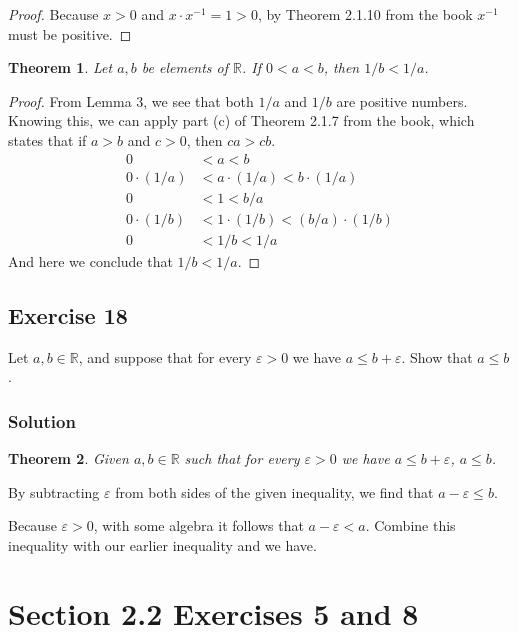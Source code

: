 \documentclass[12pt]{article}
\newtheorem*{thm}{Theorem}
\begin{document}
\begin{proof}
Because $x > 0$ and $x \cdot x^{-1} = 1 > 0$, by Theorem 2.1.10 from the book $x^{-1}$ must be positive.
\end{proof}

\begin{thm}
Let $a, b$ be elements of $\mathbb{R}$. If $0 < a < b$, then $1/b < 1/a$.
\end{thm}

\begin{proof}
From Lemma 3, we see that both $1/a$ and $1/b$ are positive numbers. Knowing this, we can apply part (c) of Theorem 2.1.7 from the book, which states that if $a > b$ and $c > 0$, then $ca > cb$.
\begin{align*}
0 &< a < b \\
0\cdot\left(1/a\right) &< a\cdot\left(1/a\right) < b\cdot\left(1/a\right) \\
0 &< 1 < b / a \\
0\cdot\left(1/b\right) &< 1\cdot\left(1/b\right) < \left(b / a\right)\cdot\left(1 / b\right)\\
0 &< 1/b < 1/a
\end{align*}
And here we conclude that $1 / b < 1 / a$.
\end{proof}

\subsection*{Exercise 18}
Let $a, b \in \mathbb{R}$, and suppose that for every $\varepsilon > 0$ we have $a \leq b + \varepsilon$. Show that $a \leq b$.

\subsubsection*{Solution}
\begin{thm}
Given $a, b \in \mathbb{R}$ such that for every $\varepsilon > 0$ we have $a \leq b + \varepsilon$, $a \leq b$.
\end{thm}

By subtracting $\varepsilon$ from both sides of the given inequality, we find that $a - \varepsilon \leq b$.

Because $\varepsilon > 0$, with some algebra it follows that $a - \varepsilon < a$. Combine this inequality with our earlier inequality and we have.

\section*{Section 2.2 Exercises 5 and 8}
\end{document}
